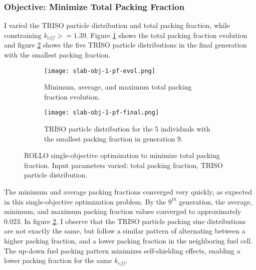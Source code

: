 \subsubsection{Objective: Minimize Total Packing Fraction}
I varied the TRISO particle distribution and total packing fraction, while
constraining $k_{eff} >= 1.39$. %
Figure \ref{fig:slab-obj-1-pf-evol} shows the total packing fraction evolution and 
figure \ref{fig:slab-obj-1-pf-final} shows the five TRISO particle distributions in 
the final generation with the smallest packing fraction. 
\begin{figure}[]
    \centering
    \begin{subfigure}{\textwidth}
        \texttt{[image: slab-obj-1-pf-evol.png]}
        \caption{Minimum, average, and maximum total packing fraction evolution.}
        \label{fig:slab-obj-1-pf-evol} 
    \end{subfigure}
    \begin{subfigure}{\textwidth}
        \texttt{[image: slab-obj-1-pf-final.png]}
        \caption{TRISO particle distribution for the 5 individuals with the 
        smallest packing fraction in generation 9.}
        \label{fig:slab-obj-1-pf-final} 
    \end{subfigure}
    \caption{ROLLO single-objective optimization to minimize total packing fraction. 
    Input parameters varied: total packing fraction, TRISO particle distribution.}
    \label{fig:slab-obj-1-pf}
\end{figure}
The minimum and average packing fractions converged very quickly, as expected 
in this single-objective optimization problem.
By the $9^{th}$ generation, the average, minimum, and maximum packing fraction
values converged to approximately 0.023. 
In figure \ref{fig:slab-obj-1-pf-final}, I observe that the TRISO particle packing 
sine distributions are not exactly the same, but follow a similar pattern of 
alternating between a higher packing fraction, and a lower packing fraction 
in the neighboring fuel cell. 
The up-down fuel packing pattern minimizes self-shielding effects, enabling  
a lower packing fraction for the same $k_{eff}$. 

